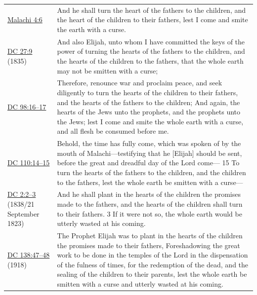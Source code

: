 			\begin{table}[H]
			\begin{tabular}{p{3cm}p{12cm}}
			\hyperref[MALACHI-4-6]{Malachi 4:6} & And he shall turn the heart of the fathers to the children, and the heart of the children to their fathers, lest I come and smite the earth with a curse. \\
			\hyperref[DC27-9]{DC 27:9} (1835)\footnotemark & And also Elijah, unto whom I have committed the keys of the power of turning the hearts of the fathers to the children, and the hearts of the children to the fathers, that the whole earth may not be smitten with a curse; \\
			\hyperref[DC98-16]{DC 98:16--17} & Therefore, renounce war and proclaim peace, and seek diligently to turn the hearts of the children to their fathers, and the hearts of the fathers to the children; And again, the hearts of the Jews unto the prophets, and the prophets unto the Jews; lest I come and smite the whole earth with a curse, and all flesh be consumed before me. \\
			\hyperref[DC110-13]{DC 110:14--15} & Behold, the time has fully come, which was spoken of by the mouth of Malachi---testifying that he [Elijah] should be sent, before the great and dreadful day of the Lord come--- 15 To turn the hearts of the fathers to the children, and the children to the fathers, lest the whole earth be smitten with a curse--- \\
			\hyperref[DC2-2]{DC 2:2--3} (1838/21 September 1823) & And he shall plant in the hearts of the children the promises made to the fathers, and the hearts of the children shall turn to their fathers. 3 If it were not so, the whole earth would be utterly wasted at his coming. \\
			\hyperref[DC138-47]{DC 138:47--48} (1918) & The Prophet Elijah was to plant in the hearts of the children the promises made to their fathers, Foreshadowing the great work to be done in the temples of the Lord in the dispensation of the fulness of times, for the redemption of the dead, and the sealing of the children to their parents, lest the whole earth be smitten with a curse and utterly wasted at his coming.
			\end{tabular}
			\end{table}
